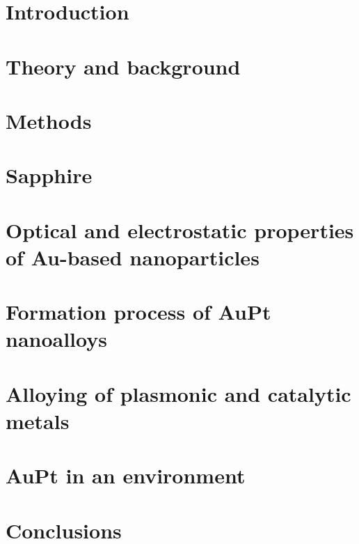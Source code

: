 \documentclass[twoside,openright,titlepage,numbers=noenddot,headinclude,footinclude=true,cleardoublepage=empty,listof=totoc,paper=a4,fontsize=12pt,australian,twoside=semi,DIV=calc]{scrreprt}
\begin{document}
  \chapter{Introduction}\label{c:Introduction}
  
  
  \chapter{Theory and background}\label{c:Theory}
  
  
    \chapter{Methods}\label{c:Methods}
  
  
  \chapter{Sapphire}\label{c:Sapphire}
  
  
  \chapter{Optical and electrostatic properties of Au-based nanoparticles}\label{c:L-M}
    

  \chapter{Formation process of AuPt nanoalloys}\label{c:Coal}
  

  \chapter{Alloying of plasmonic and catalytic metals}\label{c:Alloy}
   
 
    \chapter{AuPt in an environment}\label{c:Water}
  
  
  \chapter{Conclusions}\label{c:Conclusions}
  

  
  
\end{document}
